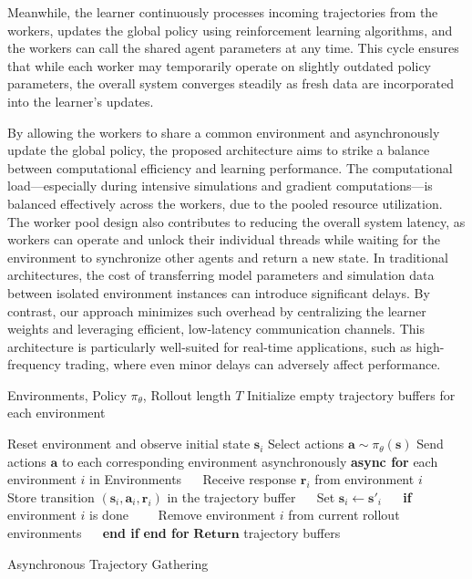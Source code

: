 \documentclass[11pt]{article}
\begin{document}
    Meanwhile, the learner continuously processes incoming trajectories from the workers, updates the global policy using reinforcement learning algorithms,
    and the workers can call the shared agent parameters at any time.
    This cycle ensures that while each worker may temporarily operate on slightly outdated policy parameters,
    the overall system converges steadily as fresh data are incorporated into the learner's updates.

    By allowing the workers to share a common environment and asynchronously update the global policy,
    the proposed architecture aims to strike a balance between computational efficiency and learning performance.
    The computational load—especially during intensive simulations and gradient computations—is balanced effectively
    across the workers, due to the pooled resource utilization.
    The worker pool design also contributes to reducing the overall system latency,
    as workers can operate and unlock their individual threads while waiting for the environment to synchronize other agents and return a new state.
    In traditional architectures, the cost of transferring model parameters and simulation data between isolated environment instances can introduce significant delays.
    By contrast, our approach minimizes such overhead by centralizing the learner weights and leveraging efficient, low-latency communication channels.
    This architecture is particularly well-suited for real-time applications, such as high-frequency trading,
    where even minor delays can adversely affect performance.

    \begin{algorithm}
        \begin{algorithmic}[1]
            \Require Environments, Policy $\pi_{\theta}$, Rollout length $T$
            \State Initialize empty trajectory buffers for each environment

                \State Reset environment and observe initial state $\mathbf{s}_i$
            \EndFor
                \State Select actions $\mathbf{a} \sim \pi_{\theta}(\mathbf{s})$
                \State Send actions $\mathbf{a}$ to each corresponding environment asynchronously
                \State \textbf{async for} {each environment $i$ in Environments}
                \State $\quad$ Receive response $\mathbf{r}_i$ from environment $i$
                \State $\quad$ Store transition $(\mathbf{s}_i, \mathbf{a}_i, \mathbf{r}_i)$ in the trajectory buffer
                \State $\quad$ Set $\mathbf{s}_i \leftarrow \mathbf{s'}_i$
                \State $\quad$ \textbf{if} environment $i$ is done
                \State $\quad$$\quad$Remove environment $i$ from current rollout environments
                \State $\quad$ \textbf{end if}
                \State \textbf{end for}
            \EndFor
            \State $\textbf{Return}$ trajectory buffers
        \end{algorithmic}
        \caption{Asynchronous Trajectory Gathering}
        \label{alg:trajectory}
    \end{algorithm}
\end{document}
